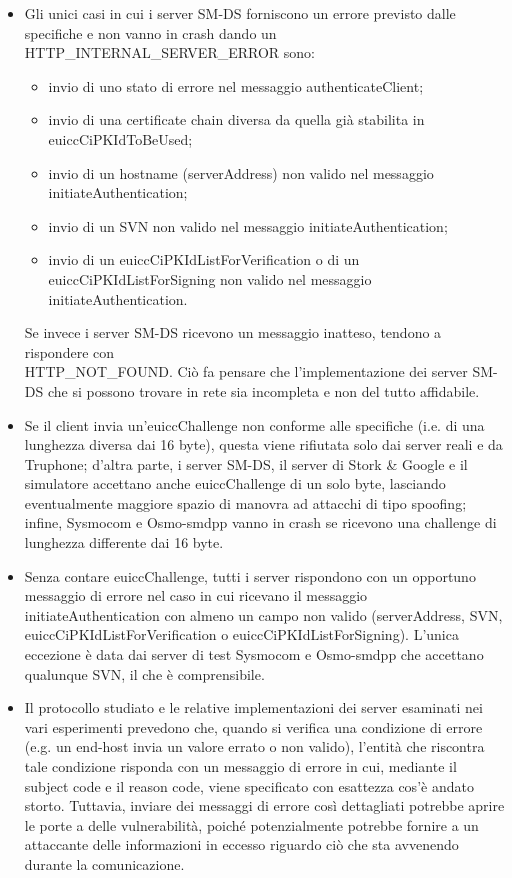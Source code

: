 \documentclass[10pt, oneside]{book}
\begin{document}
\begin{itemize}
\item Gli unici casi in cui i server SM-DS forniscono un errore previsto dalle specifiche e non vanno in crash dando un HTTP\_INTERNAL\_SERVER\_ERROR sono:
\begin{itemize}
\item invio di uno stato di errore nel messaggio authenticateClient;
\item invio di una certificate chain diversa da quella già stabilita in euiccCiPKIdToBeUsed;
\item invio di un hostname (serverAddress) non valido nel messaggio initiateAuthentication;
\item invio di un SVN non valido nel messaggio initiateAuthentication;
\item invio di un euiccCiPKIdListForVerification o di un euiccCiPKIdListForSigning non valido nel messaggio initiateAuthentication.
\end{itemize}
Se invece i server SM-DS ricevono un messaggio inatteso, tendono a rispondere con\\ HTTP\_NOT\_FOUND. Ciò fa pensare che l'implementazione dei server SM-DS che si possono trovare in rete sia incompleta e non del tutto affidabile.
\item Se il client invia un'euiccChallenge non conforme alle specifiche (i.e. di una lunghezza diversa dai 16 byte), questa viene rifiutata solo dai server reali e da Truphone; d'altra parte, i server SM-DS, il server di Stork \& Google e il simulatore accettano anche euiccChallenge di un solo byte, lasciando eventualmente maggiore spazio di manovra ad attacchi di tipo spoofing; infine, Sysmocom e Osmo-smdpp vanno in crash se ricevono una challenge di lunghezza differente dai 16 byte.
\item Senza contare euiccChallenge, tutti i server rispondono con un opportuno messaggio di errore nel caso in cui ricevano il messaggio initiateAuthentication con almeno un campo non valido (serverAddress, SVN, euiccCiPKIdListForVerification o euiccCiPKIdListForSigning). L'unica eccezione è data dai server di test Sysmocom e Osmo-smdpp che accettano qualunque SVN, il che è comprensibile.
\item Il protocollo studiato e le relative implementazioni dei server esaminati nei vari esperimenti prevedono che, quando si verifica una condizione di errore (e.g. un end-host invia un valore errato o non valido), l'entità che riscontra tale condizione risponda con un messaggio di errore in cui, mediante il subject code e il reason code, viene specificato con esattezza cos'è andato storto. Tuttavia, inviare dei messaggi di errore così dettagliati potrebbe aprire le porte a delle vulnerabilità, poiché potenzialmente potrebbe fornire a un attaccante delle informazioni in eccesso riguardo ciò che sta avvenendo durante la comunicazione.
\end{itemize}
\end{document}
